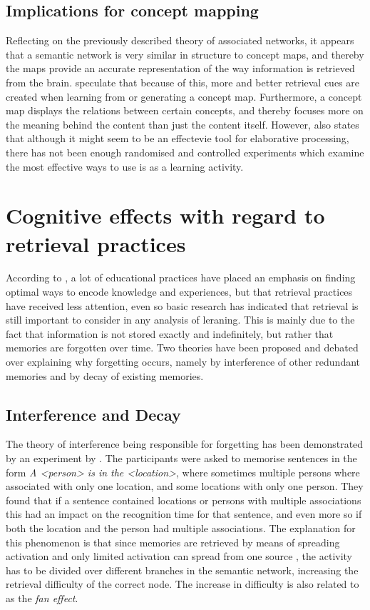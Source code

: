 \subsection{Implications for concept mapping}

Reflecting on the previously described theory of associated networks, it appears that a semantic network is very similar in structure to concept maps, and thereby the maps provide an accurate representation of the way information is retrieved from the brain.  speculate that because of this, more and better retrieval cues are created when learning from or generating a concept map. Furthermore, a concept map displays the relations between certain concepts, and thereby focuses more on the meaning behind the content than just the content itself. However,  also states that although it might seem to be an effectevie tool for elaborative processing, there has not been enough randomised and controlled experiments which examine the most effective ways to use is as a learning activity.

\section{Cognitive effects with regard to retrieval practices}

According to , a lot of educational practices have placed an emphasis on finding optimal ways to encode knowledge and experiences, but that retrieval practices have received less attention, even so basic research has indicated that retrieval is still important to consider in any analysis of leraning. This is mainly due to the fact that information is not stored exactly and indefinitely, but rather that memories are forgotten over time. Two theories have been proposed and debated over explaining why forgetting occurs, namely by interference of other redundant memories and by decay of existing memories.

\subsection{Interference and Decay}

The theory of interference being responsible for forgetting has been demonstrated by an experiment by . The participants were asked to memorise sentences in the form \emph{A <person> is in the <location>}, where sometimes multiple persons where associated with only one location, and some locations with only one person. They found that if a sentence contained locations or persons with multiple associations this had an impact on the recognition time for that sentence, and even more so if both the location and the person had multiple associations. The explanation for this phenomenon is that since memories are retrieved by means of spreading activation and only limited activation can spread from one source \cite{cognitivepsychology}, the activity has to be divided over different branches in the semantic network, increasing the retrieval difficulty of the correct node. The increase in difficulty is also related to as the \emph{fan effect}.

